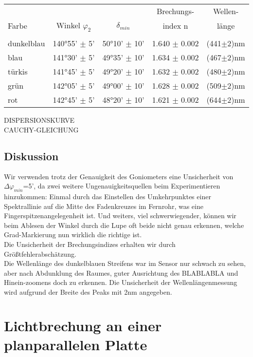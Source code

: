\documentclass{article}
\begin{document}
\begin{center}
\begin{tabular}{|l|c|c|c|c|}
\hline & & & Brechungs- & Wellen-\\
Farbe & Winkel $\varphi_2$ & $\delta_{min}$ & index n & länge\\
\hline
& & & &\\
dunkelblau & 140°55' $\pm$ 5' & 50°10' $\pm$ 10' & 1.640 $\pm$ 0.002 & (441$\pm$2)nm\\
blau & 141°30' $\pm$ 5' & 49°35' $\pm$ 10' & 1.634 $\pm$ 0.002 & (467$\pm$2)nm\\
türkis & 141°45' $\pm$ 5' & 49°20' $\pm$ 10' & 1.632 $\pm$ 0.002 & (480$\pm$2)nm\\
grün & 142°05' $\pm$ 5' & 49°00' $\pm$ 10' & 1.628 $\pm$ 0.002 & (509$\pm$2)nm\\
rot & 142°45' $\pm$ 5' & 48°20' $\pm$ 10' & 1.621 $\pm$ 0.002 & (644$\pm$2)nm\\
\hline
\end{tabular}
\end{center}
DISPERSIONSKURVE\\
CAUCHY-GLEICHUNG\\
\subsection{Diskussion}
Wir verwenden trotz der Genauigkeit des Goniometers eine Unsicherheit von $\Delta\varphi_{min}$=5', da zwei weitere Ungenauigkeitsquellen beim Experimentieren hinzukommen: Einmal durch das Einstellen des Umkehrpunktes einer Spektrallinie auf die Mitte des Fadenkreuzes im Fernrohr, was eine Fingerspitzenangelegenheit ist. Und weiters, viel schwerwiegender, können wir beim Ablesen der Winkel durch die Lupe oft beide nicht genau erkennen, welche Grad-Markierung nun wirklich die richtige ist.\\
Die Unsicherheit der Brechungsindizes erhalten wir durch Größtfehlerabschätzung.\\
Die Wellenlänge des dunkelblauen Streifens war im Sensor nur schwach zu sehen, aber nach Abdunklung des Raumes, guter Ausrichtung des BLABLABLA und Hinein-zoomens doch zu erkennen.
Die Unsicherheit der Wellenlängenmessung wird aufgrund der Breite des Peaks mit 2nm angegeben.


\section{Lichtbrechung an einer planparallelen Platte}
\end{document}
